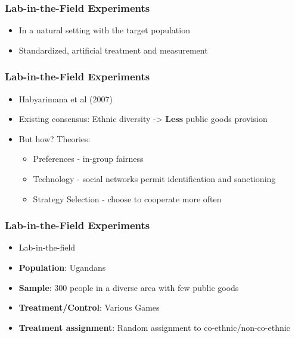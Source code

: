 \documentclass[xcolor=x11names,compress]{beamer}\usepackage[]{graphicx}\usepackage[]{color}
\renewcommand{\(}{\begin{columns}}
\renewcommand{\)}{\end{columns}}
\newcommand{\<}[1]{\begin{column}{#1}}
\renewcommand{\>}{\end{column}}
\begin{document}
\begin{frame}
\frametitle{Lab-in-the-Field Experiments}
\begin{itemize}
\item In a natural setting with the target population
\pause
\item Standardized, artificial treatment and measurement
\end{itemize}
\end{frame}

\begin{frame}
\frametitle{Lab-in-the-Field Experiments}
\begin{itemize}
\item Habyarimana et al (2007)
\pause
\item Existing consensus: Ethnic diversity -> \textbf{Less} public goods provision
\pause
\item But how? Theories:
\pause
\begin{itemize}
\item Preferences - in-group fairness
\item Technology - social networks permit identification and sanctioning
\item Strategy Selection - choose to cooperate more often
\end{itemize}
\end{itemize}
\end{frame}

\begin{frame}
\frametitle{Lab-in-the-Field Experiments}
\begin{itemize}
\item Lab-in-the-field
\item \textbf{Population}: Ugandans
\item \textbf{Sample}: 300 people in a diverse area with few public goods
\item \textbf{Treatment/Control}: Various Games
\item \textbf{Treatment assignment}: Random assignment to co-ethnic/non-co-ethnic
\end{itemize}
\end{frame}
\end{document}
